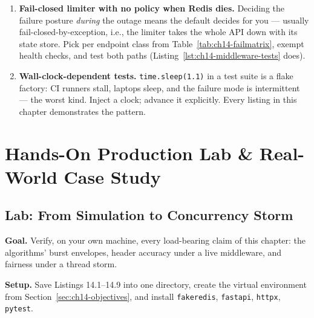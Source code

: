 \begin{enumerate}
        budget there. Weight by cost (Listing~\ref{lst:ch14-cost}) and cap
        concurrency on the heavy routes separately.
  \item \textbf{Fail-closed limiter with no policy when Redis dies.}
        Deciding the failure posture \emph{during} the outage means the
        default decides for you --- usually fail-closed-by-exception, i.e.,
        the limiter takes the whole API down with its state store. Pick per
        endpoint class from Table~\ref{tab:ch14-failmatrix}, exempt health
        checks, and test both paths (Listing~\ref{lst:ch14-middleware-tests}
        does).
  \item \textbf{Wall-clock-dependent tests.} \texttt{time.sleep(1.1)} in a
        test suite is a flake factory: CI runners stall, laptops sleep, and
        the failure mode is intermittent --- the worst kind. Inject a clock;
        advance it explicitly. Every listing in this chapter demonstrates
        the pattern.
\end{enumerate}

\section{Hands-On Production Lab \& Real-World Case Study}
\label{sec:ch14-lab}

\subsection*{Lab: From Simulation to Concurrency Storm}

\textbf{Goal.} Verify, on your own machine, every load-bearing claim of this
chapter: the algorithms' burst envelopes, header accuracy under a live
middleware, and fairness under a thread storm.

\textbf{Setup.} Save Listings 14.1--14.9 into one directory, create the
virtual environment from Section~\ref{sec:ch14-objectives}, and install
\texttt{fakeredis}, \texttt{fastapi}, \texttt{httpx}, \texttt{pytest}.

